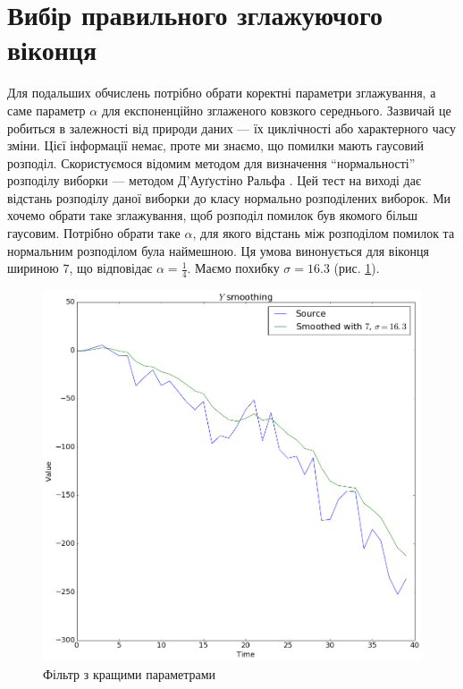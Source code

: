 \section{Вибір правильного зглажуючого віконця}

Для подальших обчислень потрібно обрати коректні параметри зглажування,
а саме параметр $\alpha$ для експоненційно зглаженого ковзкого середнього.
Зазвичай це робиться в залежності від природи даних ---
їх циклічності або характерного часу зміни.
Цієї інформації немає, проте ми знаємо, що помилки мають гаусовий розподіл.
Скористуємося відомим методом
для визначення ``нормальності'' розподілу виборки ---
методом Д'Ауґустіно Ральфа \cite{dago1990}.
Цей тест на виході дає відстань розподілу даної виборки
до класу нормально розподілених виборок.
Ми хочемо обрати таке зглажування,
щоб розподіл помилок був якомого більш гаусовим.
Потрібно обрати таке $\alpha$,
для якого відстань між розподілом помилок та нормальним розподілом
була наймешною.
Ця умова винонується для віконця шириною $7$,
що відповідає $\alpha = \frac{1}{4}$.
Маємо похибку $\sigma = 16.3$ (рис. \ref{fig:span:fixed}).

\begin{figure}[h!]
  \centering
  \includegraphics[width=\textwidth]{Coursework_files/Coursework_24_0.png}
  \caption{Фільтр з кращими параметрами}
  \label{fig:span:fixed}
\end{figure}

